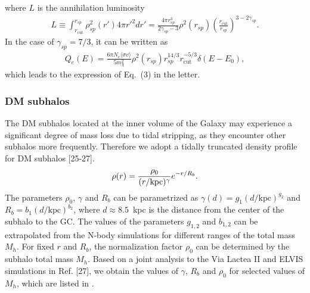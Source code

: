 where  $L$ is the annihilation luminosity
\begin{align}
L
\equiv\int_{r_{\text{cut}}}^{r_{sp}} \rho_{sp}^{2}(r') 4\pi r'^{2} dr' 
=\frac{4\pi r_{sp}^{3}}{2\gamma_{sp}-3}\rho^{2}(r_{sp}) 
\left( \frac{r_{\text{cut}}}{r_{sp}}\right)^{3-2\gamma_{sp}} .
\end{align}
In the case of  $\gamma_{sp}=7/3$, it can be written as
\begin{align}
Q_{e}(E)=\frac{6 \pi N_{e} \langle\sigma v\rangle}{5 m_{\chi}^{2}} 
\rho^{2}(r_{sp}) r_{sp}^{14/3} r_{\text{cut}}^{-5/3} 
\delta(E-E_{0})  ,
\end{align}
which leads to the expression  of Eq.~(3) %
in the letter.








\subsubsection{DM subhalos}
The DM subhalos located at  the inner volume of the Galaxy
may experience a significant degree of mass loss due to tidal stripping,
as they encounter other subhalos more frequently.
Therefore we  adopt a tidally truncated  density profile for DM subhalos
[25-27].
\begin{align}
\rho(r)	
=
\frac{\rho_{0}}{(r/\text{kpc})^{\gamma}}e^{-r/R_{b}}  .
\end{align}
The parameters  $\rho_{0}$, $\gamma$ and $R_{b}$ can be parametrized as 
$\gamma(d)=g_{1}(d/\text{kpc})^{g_{2}}$ and $R_{b}=b_{1}(d/\text{kpc})^{b_{2}}$,
where $d\approx 8.5$~kpc is  
the distance from the center of the subhalo to the GC.
The values of the parameters $g_{1,2}$ and $b_{1,2}$   
can be extrapolated from the N-body simulations
for different ranges of the total mass $M_{h}$. 
For fixed $r$ and $R_{b}$,
the normalization factor $\rho_{0}$ can be  determined by the subhalo total mass $M_{h}$.
Based on  a joint analysis to the Via Lactea II and  ELVIS simulations
in Ref. [27],
we obtain the values of $\gamma$, $R_{b}$ and $\rho_{0}$ for selected values of 
$M_{h}$, which are listed in .


